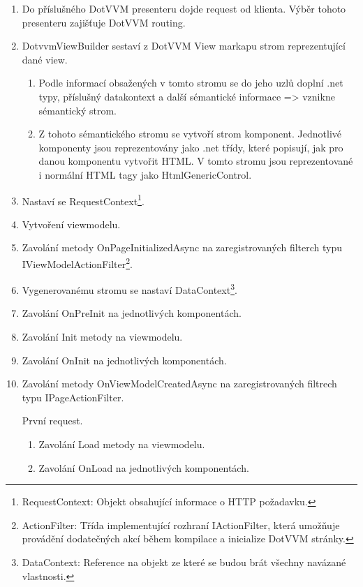 \begin{enumerate}
    \item Do příslušného DotVVM presenteru dojde request od klienta. Výběr tohoto presenteru zajišťuje DotVVM routing.
    \item DotvvmViewBuilder sestaví z DotVVM View markapu strom reprezentující dané view. 
    \begin{enumerate}[label*=\arabic*.]
        \item Podle informací obsažených v tomto stromu se do jeho uzlů doplní .net typy, příslušný datakontext a další sémantické informace => vznikne sémantický strom.
        \item Z tohoto sémantického stromu se vytvoří strom komponent. Jednotlivé komponenty jsou reprezentovány jako .net třídy, které popisují, jak pro danou komponentu vytvořit HTML. V tomto stromu jsou reprezentované i normální HTML tagy jako HtmlGenericControl.
    \end{enumerate}
    \item Nastaví se RequestContext\footnote{RequestContext: Objekt obsahující informace o HTTP požadavku.}.
    \item Vytvoření viewmodelu.
    \item Zavolání metody OnPageInitializedAsync na zaregistrovaných filterch typu IViewModelActionFilter\footnote{\label{ActionFilterNote}ActionFilter: Třída implementující rozhraní IActionFilter, která umožňuje provádění dodatečných akcí během kompilace a inicialize DotVVM stránky. }.
    \item Vygenerovanému stromu se nastaví DataContext\footnote{\label{DataContext}DataContext: Reference na objekt ze které se budou brát všechny navázané vlastnosti.}.
    \item Zavolání OnPreInit na jednotlivých komponentách.
    \item Zavolání Init metody na viewmodelu.
    \item Zavolání OnInit na jednotlivých komponentách.
    \item Zavolání metody OnViewModelCreatedAsync na zaregistrovaných filtrech typu IPageActionFilter.
    \pagebreak
    \begin{multicols}{2}
        První request.
        \begin{enumerate}[label*=\arabic*.]
            \item Zavolání Load metody na viewmodelu.
            \item Zavolání OnLoad na jednotlivých komponentách.
        \end{enumerate}

\end{multicols}
\end{enumerate}
